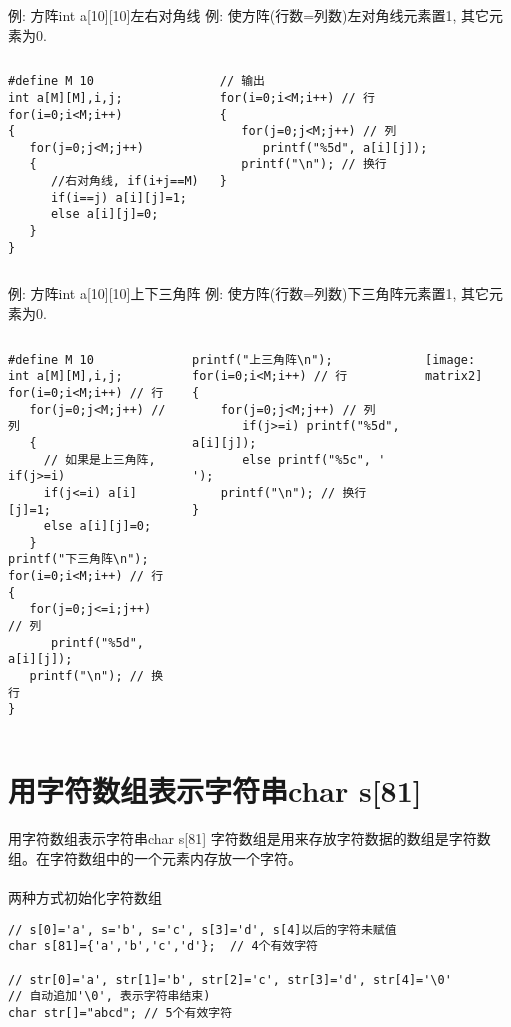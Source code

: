\begin{frame}{例: 方阵int a[10][10]左右对角线}
例: 使方阵(行数=列数)左对角线元素置1, 其它元素为0.
\begin{columns}[T]
\begin{lstlisting}
#define M 10 
int a[M][M],i,j;
for(i=0;i<M;i++) 
{
   for(j=0;j<M;j++) 
   {
      //右对角线, if(i+j==M)
      if(i==j) a[i][j]=1; 
      else a[i][j]=0;
   }
}
\end{lstlisting}
\begin{lstlisting}
// 输出
for(i=0;i<M;i++) // 行
{
   for(j=0;j<M;j++) // 列
      printf("%5d", a[i][j]); 
   printf("\n"); // 换行
}
\end{lstlisting}
\end{columns}
\end{frame}

\begin{frame}{例: 方阵int a[10][10]上下三角阵}
\small
例: 使方阵(行数=列数)下三角阵元素置1, 其它元素为0.
\begin{columns}[T]
\begin{lstlisting}
#define M 10 
int a[M][M],i,j;
for(i=0;i<M;i++) // 行
   for(j=0;j<M;j++) // 列
   {
     // 如果是上三角阵, if(j>=i)
     if(j<=i) a[i][j]=1; 
     else a[i][j]=0;
   }
printf("下三角阵\n"); 
for(i=0;i<M;i++) // 行
{
   for(j=0;j<=i;j++) // 列
      printf("%5d", a[i][j]); 
   printf("\n"); // 换行
}
\end{lstlisting}
\begin{lstlisting}
printf("上三角阵\n"); 
for(i=0;i<M;i++) // 行
{
    for(j=0;j<M;j++) // 列
       if(j>=i) printf("%5d", a[i][j]);
       else printf("%5c", ' '); 
    printf("\n"); // 换行
}
\end{lstlisting}
\texttt{[image: matrix2]}
\end{columns}
\vspace{0.001cm}
\end{frame}

\section{用字符数组表示字符串char s[81]}

\begin{frame}{用字符数组表示字符串char s[81]}
字符数组是用来存放字符数据的数组是字符数组。在字符数组中的一个元素内存放一个字符。\\
~\\
两种方式初始化字符数组
\begin{lstlisting}
// s[0]='a', s='b', s='c', s[3]='d', s[4]以后的字符未赋值
char s[81]={'a','b','c','d'};  // 4个有效字符

// str[0]='a', str[1]='b', str[2]='c', str[3]='d', str[4]='\0'
// 自动追加'\0', 表示字符串结束)
char str[]="abcd"; // 5个有效字符
\end{lstlisting}
\end{frame}

